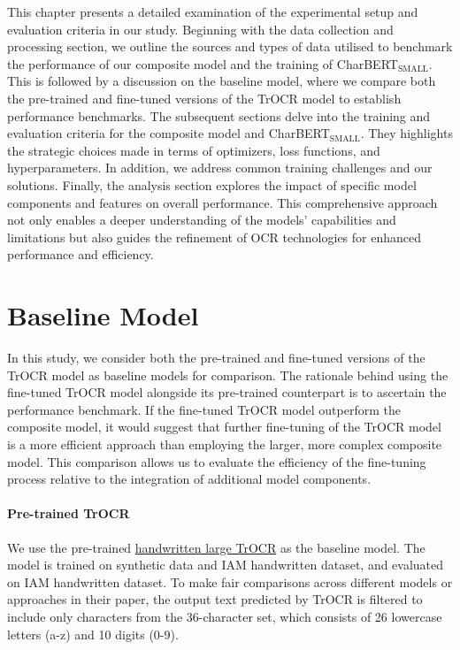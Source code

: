 \label{chap:4_experiment}
This chapter presents a detailed examination of the experimental setup and evaluation criteria in our study. Beginning with the data collection and processing section, we outline the sources and types of data utilised to benchmark the performance of our composite model and the training of CharBERT${_\text{SMALL}}$. This is followed by a discussion on the baseline model, where we compare both the pre-trained and fine-tuned versions of the TrOCR model to establish performance benchmarks. The subsequent sections delve into the training and evaluation criteria for the composite model and CharBERT${_\text{SMALL}}$. They highlights the strategic choices made in terms of optimizers, loss functions, and hyperparameters. In addition, we address common training challenges and our solutions. Finally, the analysis section explores the impact of specific model components and features on overall performance. This comprehensive approach not only enables a deeper understanding of the models' capabilities and limitations but also guides the refinement of OCR technologies for enhanced performance and efficiency.
\section{Baseline Model}
\label{sec:4_baseline_model}
In this study, we consider both the pre-trained and fine-tuned versions of the TrOCR model as baseline models for comparison. The rationale behind using the fine-tuned TrOCR model alongside its pre-trained counterpart is to ascertain the performance benchmark. If the fine-tuned TrOCR model outperform the composite model, it would suggest that further fine-tuning of the TrOCR model is a more efficient approach than employing the larger, more complex composite model. This comparison allows us to evaluate the efficiency of the fine-tuning process relative to the integration of additional model components.
\paragraph*{Pre-trained TrOCR}
\label{par:4_pre-trained_trocr}
We use the pre-trained \href{https://huggingface.co/microsoft/trocr-large-handwritten}{handwritten large TrOCR} as the baseline model. The model is trained on synthetic data and IAM handwritten dataset, and evaluated on IAM handwritten dataset. To make fair comparisons across different models or approaches in their paper, the output text predicted by TrOCR is filtered to include only characters from the 36-character set, which consists of 26 lowercase letters (a-z) and 10 digits (0-9). 
